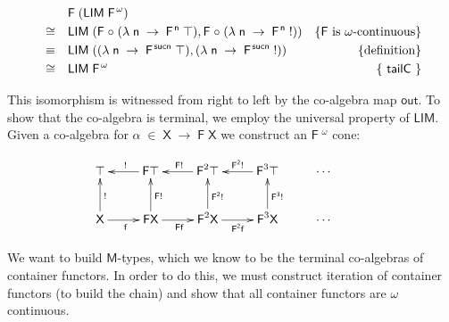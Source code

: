 \documentclass[a4paper]{article}
\newcommand{\Conid}[1]{\mathit{#1}}
\newcommand{\Varid}[1]{\mathit{#1}}
\renewcommand\Varid[1]{\mathord{\textsf{#1}}}
\let\Conid\Varid
\begin{document}
\begin{align*}
&&& \ensuremath{\Conid{F}\;(\Conid{LIM}\;\Conid{F}\;\!^{\omega})} & \\
&\cong&& \ensuremath{\Conid{LIM}\;(\Conid{F}\;\ensuremath{\mbox{$\circ$}}\;(\lambda\;\Varid{n}\;\rightarrow\;\Conid{F}\;\!^{\Varid{n}}\;\top),\Conid{F}\;\ensuremath{\mbox{$\circ$}}\;(\lambda\;\Varid{n}\;\rightarrow\;\Conid{F}\;\!^{\Varid{n}}\;\mathbin{!}))} & \{\mbox{\ensuremath{\Conid{F}} is $\omega$-continuous}\} \\
&\equiv&& \ensuremath{\Conid{LIM}\;((\lambda\;\Varid{n}\;\rightarrow\;\Conid{F}\;\!^{\Varid{suc}\Varid{n}}\;\top),(\lambda\;\Varid{n}\;\rightarrow\;\Conid{F}\;\!^{\Varid{suc}\Varid{n}}\;\mathbin{!}))} & \{\mbox{definition}\}\\
&\cong&& \ensuremath{\Conid{LIM}\;\Conid{F}\;\!^{\omega}} & \{\mbox{ \ensuremath{\Varid{tailC}} }\} \\
\end{align*}


This isomorphism is witnessed from right to left by the co-algebra map \ensuremath{\Varid{out}}.
To show that the co-algebra is terminal, we employ the universal property of
\ensuremath{\Conid{LIM}}. Given a co-algebra for \ensuremath{\alpha\;\in\;\Conid{X}\;\rightarrow\;\Conid{F}\;\Conid{X}} we construct an \ensuremath{\Conid{F}\;\!^{\omega}} cone:

\[
\xymatrix{
\ensuremath{\top} &
\ar[l]_{\ensuremath{\mathbin{!}}}
\ensuremath{\Conid{F}} \ensuremath{\top} &
\ar[l]_{\ensuremath{\Conid{F}} \ensuremath{\mathbin{!}}}
\ensuremath{\Conid{F}}^{2} \ensuremath{\top} &
\ar[l]_{\ensuremath{\Conid{F}}^{\ensuremath{\Varid{2}}} \ensuremath{\mathbin{!}}}
\ensuremath{\Conid{F}}^{3} \ensuremath{\top} &
\cdots & \\
\ensuremath{\Conid{X}} 
\ar[u]_{\ensuremath{\mathbin{!}}}
\ar[r]_{\ensuremath{\Varid{f}}} &
\ensuremath{\Conid{F}} \ensuremath{\Conid{X}} 
\ar[u]_{\ensuremath{\Conid{F}} \ensuremath{\mathbin{!}}}
\ar[r]_{\ensuremath{\Conid{F}} \ensuremath{\Varid{f}}} &
\ensuremath{\Conid{F}}^{2} \ensuremath{\Conid{X}}
\ar[u]_{\ensuremath{\Conid{F}}^{\ensuremath{\Varid{2}}} \ensuremath{\mathbin{!}}} 
\ar[r]_{\ensuremath{\Conid{F}}^{\ensuremath{\Varid{2}}} \ensuremath{\Varid{f}}} &
\ensuremath{\Conid{F}}^{3} \ensuremath{\Conid{X}}
\ar[u]_{\ensuremath{\Conid{F}}^{\ensuremath{\Varid{3}}} \ensuremath{\mathbin{!}}} 
 &
\cdots \\
}
\]

We 
want to build \ensuremath{\Conid{M}}-types, which we know to be the terminal co-algebras of 
container functors. In order to do this, we must construct 
iteration of container functors (to build the chain) and show that all container
functors are $\omega$ continuous.
\end{document}
